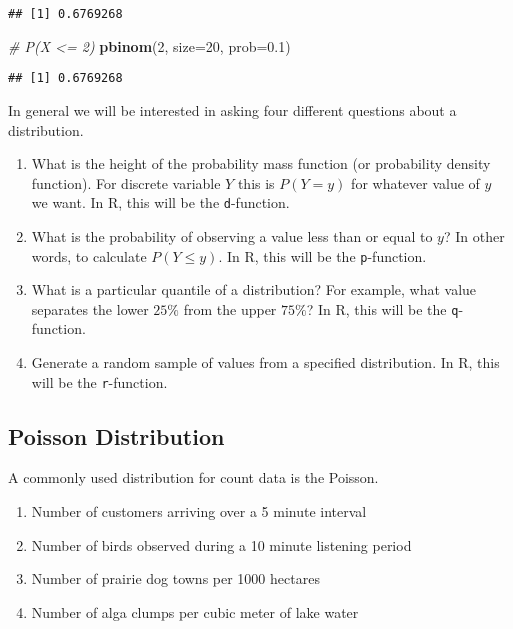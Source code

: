 \documentclass[]{book}
\newenvironment{Shaded}{\begin{snugshade}}{\end{snugshade}}
\newcommand{\KeywordTok}[1]{\textcolor[rgb]{0.13,0.29,0.53}{\textbf{{#1}}}}
\newcommand{\DataTypeTok}[1]{\textcolor[rgb]{0.13,0.29,0.53}{{#1}}}
\newcommand{\DecValTok}[1]{\textcolor[rgb]{0.00,0.00,0.81}{{#1}}}
\newcommand{\FloatTok}[1]{\textcolor[rgb]{0.00,0.00,0.81}{{#1}}}
\newcommand{\CommentTok}[1]{\textcolor[rgb]{0.56,0.35,0.01}{\textit{{#1}}}}
\newcommand{\NormalTok}[1]{{#1}}
\providecommand{\tightlist}{%
  \setlength{\itemsep}{0pt}\setlength{\parskip}{0pt}}
\begin{document}
\begin{verbatim}
## [1] 0.6769268
\end{verbatim}

\begin{Shaded}
\begin{Highlighting}[]
\CommentTok{# P(X <= 2)}
\KeywordTok{pbinom}\NormalTok{(}\DecValTok{2}\NormalTok{, }\DataTypeTok{size=}\DecValTok{20}\NormalTok{, }\DataTypeTok{prob=}\FloatTok{0.1}\NormalTok{)}
\end{Highlighting}
\end{Shaded}

\begin{verbatim}
## [1] 0.6769268
\end{verbatim}

In general we will be interested in asking four different questions
about a distribution.

\begin{enumerate}
\def\labelenumi{\arabic{enumi}.}
\tightlist
\item
  What is the height of the probability mass function (or probability
  density function). For discrete variable \(Y\) this is
  \(P\left(Y=y\right)\) for whatever value of \(y\) we want. In R, this
  will be the \texttt{d}-function.
\item
  What is the probability of observing a value less than or equal to
  \(y\)? In other words, to calculate \(P\left(Y\le y\right)\). In R,
  this will be the \texttt{p}-function.
\item
  What is a particular quantile of a distribution? For example, what
  value separates the lower \(25\%\) from the upper \(75\%\)? In R, this
  will be the \texttt{q}-function.
\item
  Generate a random sample of values from a specified distribution. In
  R, this will be the \texttt{r}-function.
\end{enumerate}

\subsection{Poisson Distribution}\label{poisson-distribution}

A commonly used distribution for count data is the Poisson.

\begin{enumerate}
\def\labelenumi{\arabic{enumi}.}
\tightlist
\item
  Number of customers arriving over a 5 minute interval
\item
  Number of birds observed during a 10 minute listening period
\item
  Number of prairie dog towns per 1000 hectares
\item
  Number of alga clumps per cubic meter of lake water
\end{enumerate}
\end{document}

